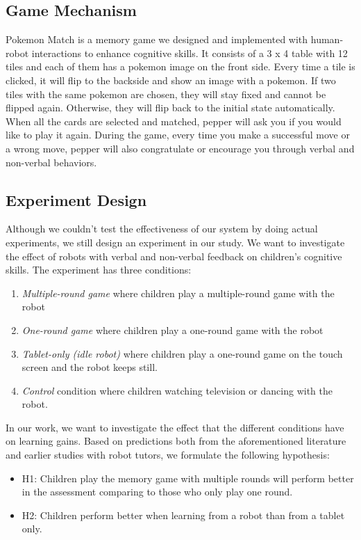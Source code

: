 \documentclass[12pt]{article}
\begin{document}
\subsection{Game Mechanism}
Pokemon Match is a memory game we designed and implemented with human-robot interactions to enhance cognitive skills. It consists of a 3 x 4 table with 12 tiles and each of them has a pokemon image on the front side. Every time a tile is clicked, it will flip to the backside and show an image with a pokemon. If two tiles with the same pokemon are chosen, they will stay fixed and cannot be flipped again. Otherwise, they will flip back to the initial state automatically. When all the cards are selected and matched, pepper will ask you if you would like to play it again. During the game, every time you make a successful move or a wrong move, pepper will also congratulate or encourage you through verbal and non-verbal behaviors.

\subsection{Experiment Design}
Although we couldn't test the effectiveness of our system by doing actual experiments, we still design an experiment in our study. We want to investigate the effect of robots with verbal and non-verbal feedback on children's cognitive skills. The experiment has three conditions:
\begin{enumerate}
\item \textit{Multiple-round game} where children play a multiple-round game with the robot
\item \textit{One-round game} where children play a one-round game with the robot
\item \textit{Tablet-only (idle robot)} where children play a one-round game on the touch screen and the robot keeps still.
\item \textit{Control} condition where children watching television or dancing with the robot.
\end{enumerate}

In our work, we want to investigate the effect that the different conditions have on learning gains. Based on predictions both from the aforementioned literature and earlier studies with robot tutors, we formulate the following hypothesis:
\begin{itemize}
\item H1: Children play the memory game with multiple rounds will perform better in the assessment comparing to those who only play one round.
\item H2: Children perform better when learning from a robot than from a tablet only.
\end{itemize}
\end{document}
